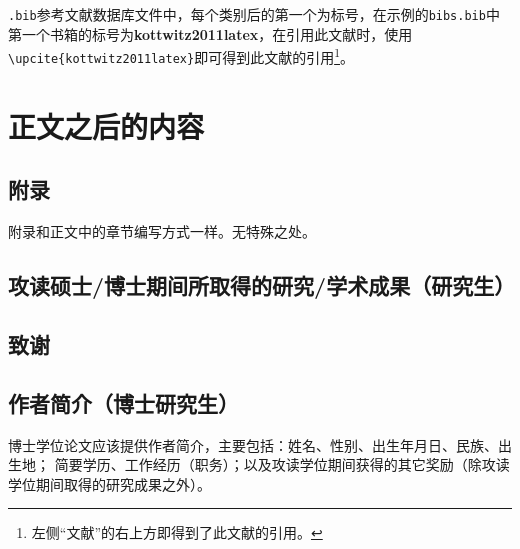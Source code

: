 \texttt{.bib}参考文献数据库文件中，每个类别后的第一个为标号，在示例的\texttt{bibs.bib}中第一个书箱的标号为\textbf{kottwitz2011latex}，在引用此文献时，使用\verb|\upcite{kottwitz2011latex}|即可得到此文献的引用\footnote{左侧“文献”的右上方即得到了此文献的引用。}。

\section{正文之后的内容}
\subsection{附录}
附录和正文中的章节编写方式一样。无特殊之处。
\subsection{攻读硕士\slash 博士期间所取得的研究\slash 学术成果（研究生）}
\subsection{致谢}
\subsection{作者简介（博士研究生）}
博士学位论文应该提供作者简介，主要包括：姓名、性别、出生年月日、民族、出生地；
简要学历、工作经历（职务）；以及攻读学位期间获得的其它奖励（除攻读学位期间取得的研究成果之外）。